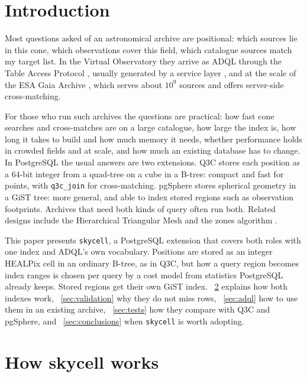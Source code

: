 
\section{Introduction}

Most questions asked of an astronomical archive are positional: which sources lie in
this cone, which observations cover this field, which catalogue sources match my target
list. In the Virtual Observatory they arrive as ADQL \citep{adql}
through the Table Access Protocol \citep{tap}, usually generated by a service layer
\citep[e.g.][]{dachs}, and at the scale of the ESA Gaia Archive
\citep{gaiaarchive1, gaiaarchive2}, which serves about $10^9$ sources and offers
server-side cross-matching.

For those who run such archives the questions are practical: how fast cone searches
and cross-matches are on a large catalogue, how large the index is, how long it takes to
build and how much memory it needs, whether performance holds in crowded fields and at
scale, and how much an existing database has to change. In PostgreSQL the usual answers
are two extensions. Q3C
\citep{q3c} stores each position as a 64-bit integer from a quad-tree on a cube in a
B-tree: compact and fast for points, with \texttt{q3c\_join} for cross-matching.
pgSphere \citep{pgsphere} stores spherical geometry in a GiST tree: more general, and
able to index stored regions such as observation footprints. Archives that need both kinds of query often run both. Related designs
include the Hierarchical Triangular Mesh \citep{htm} and the zones algorithm
\citep{zones}.

This paper presents \texttt{skycell}, a PostgreSQL extension that covers both roles
with one index and ADQL's own vocabulary. Positions are stored as an integer HEALPix cell
in an ordinary B-tree, as in Q3C, but how a query region becomes index ranges is chosen
per query by a cost model from statistics PostgreSQL already keeps. Stored regions get
their own GiST index. \Sect~\ref{sec:method} explains how
both indexes work, \Sect~\ref{sec:validation} why they do not miss rows,
\Sect~\ref{sec:adql} how to use them in an existing archive, \Sect~\ref{sec:tests}
how they compare with Q3C and pgSphere, and \Sect~\ref{sec:conclusions} when
\texttt{skycell} is worth adopting.

\section{How skycell works}
\label{sec:method}

